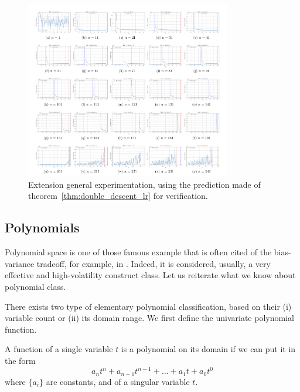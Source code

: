 \documentclass[10pt]{article} %
\begin{document}
\begin{figure}[htb]
    \centering
    \includegraphics[width=0.8\textwidth]{pdf/linear_gen.pdf}
    \caption{Extension general experimentation, using the prediction made of theorem~\ref{thm:double_descent_lr} for verification.}
\end{figure}

\clearpage

\subsection{Polynomials}

Polynomial space is one of those famous example that is often cited of the bias-variance tradeoff, for example, in \cite{goodfellow2016deep,10.5555/2930837}. Indeed, it is considered, usually, a very effective and high-volatility construct class. Let us reiterate what we know about polynomial class. 

There exists two type of elementary polynomial classification, based on their (i) variable count or (ii) its domain range. We first define the univariate polynomial function.

\begin{definition}
    A function of a single variable $t$ is a polynomial on its domain if we can put it in the form 
    \begin{equation}
        a_{n}t^{n} + a_{n-1}t^{n-1} + \dots + a_{1}t + a_{0}t^{0}
    \end{equation}
    where $\{a_{i}\}$ are constants, and of a singular variable $t$.  
\end{definition}
\end{document}
